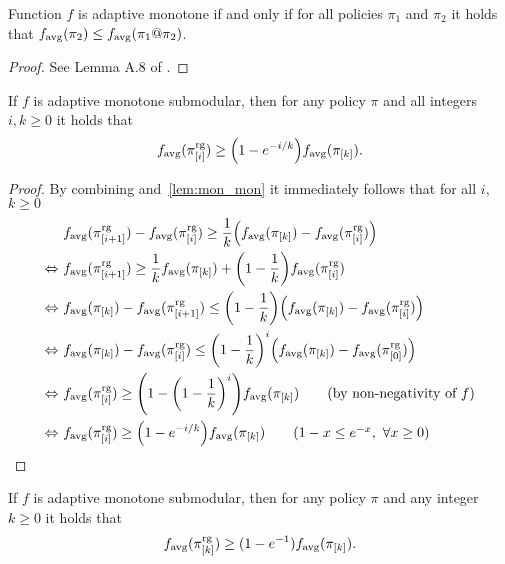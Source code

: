 \begin{lemma}\label{lem:mon_mon}
  Function $f$ is adaptive monotone if and only if for all policies $\pi_1$ and $\pi_2$ it holds that $f_{\mathrm{avg}}(\pi_2) \leq f_{\mathrm{avg}}(\pi_1 @ \pi_2)$.
\end{lemma}
\begin{proof}
See Lemma A.8 of \citet{golovin11}.
\end{proof}

\begin{theorem}
  If $f$ is adaptive monotone submodular, then for any policy $\pi$ and all integers $i, k \geq 0$ it holds that
  \begin{align*}
    \favg(\pigi) \geq \left(1 - e^{-i/k}\right)\favg(\pik).
  \end{align*}
\end{theorem}
\begin{proof}
  By combining  and~\ref{lem:mon_mon} it immediately follows that for all $i$, $k \geq 0$
  \begin{align*}
                   &\ \favg(\pigii) - \favg(\pigi) \geq \frac{1}{k}\left(\favg(\pik) - \favg(\pigi)\right)\\
    \Leftrightarrow&\ \favg(\pigii) \geq \frac{1}{k}\favg(\pik) + \left(1 - \frac{1}{k}\right) \favg(\pigi)\\
    \Leftrightarrow&\ \favg(\pik) - \favg(\pigii) \leq \left(1 - \frac{1}{k}\right)\left(\favg(\pik) - \favg(\pigi)\right)\\
    \Leftrightarrow&\ \favg(\pik) - \favg(\pigi) \leq \left(1 - \frac{1}{k}\right)^{i}\left(\favg(\pik) - \favg(\pigo)\right)\\
    \Leftrightarrow&\ \favg(\pigi) \geq \left(1 - \left(1 - \frac{1}{k}\right)^{i}\right)\favg(\pik)\tag*{(by non-negativity of $f$)}\\
    \Leftrightarrow&\ \favg(\pigi) \geq \left(1 - e^{-i/k}\right)\favg(\pik)\tag*{($1 - x \leq e^{-x},\ \forall x \geq 0$)}
  \end{align*}
\end{proof}

\begin{cor}
  If $f$ is adaptive monotone submodular, then for any policy $\pi$ and any integer $k \geq 0$ it holds that
  \begin{align*}
    f_{\mathrm{avg}}(\pi^{\textrm{rg}}_{[k]}) \geq (1 - e^{-1})f_{\mathrm{avg}}(\pi_{[k]}).
  \end{align*}
\end{cor}

